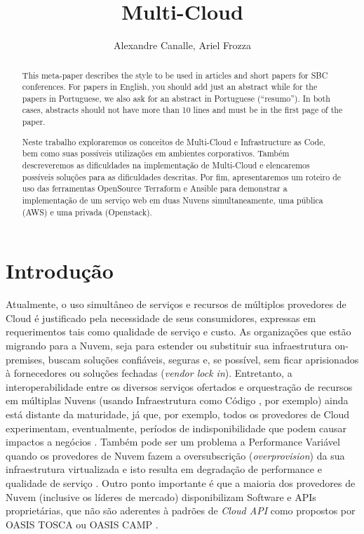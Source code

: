 \documentclass[12pt]{article}
\title{Multi-Cloud}
\author{Alexandre Canalle\inst{1}, Ariel Frozza\inst{1}}
\begin{document}
\sloppy
\maketitle
	
\begin{abstract}
	This meta-paper describes the style to be used in articles and short papers
	for SBC conferences. For papers in English, you should add just an abstract
	while for the papers in Portuguese, we also ask for an abstract in
	Portuguese (``resumo''). In both cases, abstracts should not have more than
	10 lines and must be in the first page of the paper.
\end{abstract}

\begin{abstract} 
	Neste trabalho exploraremos os conceitos de Multi-Cloud e Infrastructure as Code, bem como suas possíveis utilizações em ambientes corporativos. Também descreveremos as dificuldades na implementação de Multi-Cloud e elencaremos possíveis soluções para as dificuldades descritas.  Por fim, apresentaremos um roteiro de uso das ferramentas OpenSource Terraform e Ansible para demonstrar a implementação de um serviço web em duas Nuvens simultaneamente, uma pública (AWS) e uma privada (Openstack).
\end{abstract}

	\section{Introdução}
	    Atualmente, o uso simultâneo de serviços e recursos de múltiplos provedores de Cloud é justificado pela necessidade de seus consumidores, expressas em requerimentos tais como qualidade de serviço e custo. As organizações que estão migrando para a Nuvem, seja para estender ou substituir sua infraestrutura on-premises, buscam soluções confiáveis, seguras e, se possível, sem ficar aprisionados à fornecedores ou soluções fechadas (\textit{vendor lock in}). Entretanto, a interoperabilidade entre os diversos serviços ofertados e orquestração de recursos em múltiplas Nuvens (usando Infraestrutura como Código \cite{Morris:2016}, por exemplo) ainda está distante da maturidade, já que, por exemplo, todos os provedores de Cloud experimentam, eventualmente, períodos de indisponibilidade que podem causar impactos a negócios \cite{Fisher:2018}. Também pode ser um problema a Performance Variável quando os provedores de Nuvem fazem a oversubscrição (\textit{overprovision}) da sua infraestrutura virtualizada e isto resulta em degradação de performance e qualidade de serviço \cite{CloudSpectator:2017}. Outro ponto importante é que a maioria dos provedores de Nuvem  (inclusive os líderes de mercado) disponibilizam Software e APIs proprietárias, que não são aderentes à padrões de \textit{Cloud API} como propostos por OASIS TOSCA \cite{TOSCA:2019} ou OASIS CAMP \cite{CAMP:2019}.
	    
\end{document}
